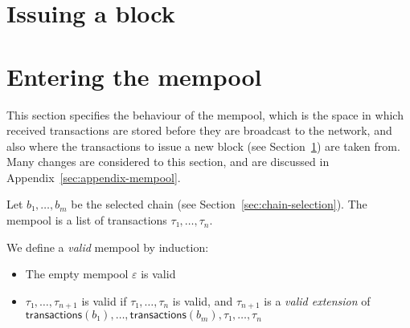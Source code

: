 \documentclass{article}
\newcommand{\emptylist}{ε}
\newcommand{\transactions}[1]{\mathsf{transactions}(#1)}
\begin{document}
\section{Issuing a block}
\label{sec:extending-blockchain}


\section{Entering the mempool}
\label{sec:entering-mempool}

This section specifies the behaviour of the mempool, which is the
space in which received transactions are stored before they are
broadcast to the network, and also where the transactions to issue a
new block (see Section~\ref{sec:extending-blockchain}) are taken
from. Many changes are considered to this section, and are discussed
in Appendix~\ref{sec:appendix-mempool}.

Let $b₁,…,b_m$ be the selected chain (see
Section~\ref{sec:chain-selection}). The mempool is a list of
transactions $τ₁,…,τ_n$.

We define a \emph{valid} mempool by induction:
\begin{itemize}
\item The empty mempool $\emptylist$ is valid
\item $τ₁,…,τ_{n+1}$ is valid if $τ₁,…,τ_n$ is valid, and $τ_{n+1}$ is
  a \emph{valid extension} of $\transactions{b₁},…,\transactions{b_m}, τ₁,…,τ_n$
\end{itemize}
\end{document}
